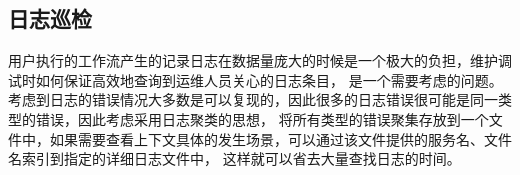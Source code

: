 \subsection{日志巡检}

用户执行的工作流产生的记录日志在数据量庞大的时候是一个极大的负担，维护调试时如何保证高效地查询到运维人员关心的日志条目，
是一个需要考虑的问题。考虑到日志的错误情况大多数是可以复现的，因此很多的日志错误很可能是同一类型的错误，因此考虑采用日志聚类的思想，
将所有类型的错误聚集存放到一个文件中，如果需要查看上下文具体的发生场景，可以通过该文件提供的服务名、文件名索引到指定的详细日志文件中，
这样就可以省去大量查找日志的时间。

%
